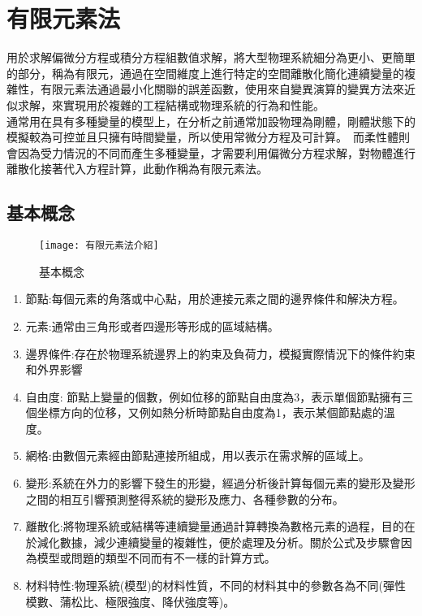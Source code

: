 \chapter{有限元素法}
用於求解偏微分方程或積分方程組數值求解，將大型物理系統細分為更小、更簡單的部分，稱為有限元，通過在空間維度上進行特定的空間離散化簡化連續變量的複雜性，有限元素法通過最小化關聯的誤差函數，使用來自變異演算的變異方法來近似求解，來實現用於複雜的工程結構或物理系統的行為和性能。\\
通常用在具有多種變量的模型上，在分析之前通常加設物理為剛體，剛體狀態下的模擬較為可控並且只擁有時間變量，所以使用常微分方程及可計算。\
而柔性體則會因為受力情況的不同而產生多種變量，才需要利用偏微分方程求解，對物體進行離散化接著代入方程計算，此動作稱為有限元素法。\\
\section{基本概念}

\begin{figure}[hbt!]
\begin{center}
\texttt{[image: 有限元素法介紹]}
\caption{\Large 基本概念}\label{有限元素法介紹}
\end{center}
\end{figure}

\begin{enumerate}
\item 節點:每個元素的角落或中心點，用於連接元素之間的邊界條件和解決方程。
\item 元素:通常由三角形或者四邊形等形成的區域結構。
\item 邊界條件:存在於物理系統邊界上的約束及負荷力，模擬實際情況下的條件約束和外界影響
\item 自由度: 節點上變量的個數，例如位移的節點自由度為3，表示單個節點擁有三個坐標方向的位移，又例如熱分析時節點自由度為1，表示某個節點處的溫度。
\item 網格:由數個元素經由節點連接所組成，用以表示在需求解的區域上。
\item 變形:系統在外力的影響下發生的形變，經過分析後計算每個元素的變形及變形之間的相互引響預測整得系統的變形及應力、各種參數的分布。
\item 離散化:將物理系統或結構等連續變量通過計算轉換為數格元素的過程，目的在於減化數據，減少連續變量的複雜性，便於處理及分析。關於公式及步驟會因為模型或問題的類型不同而有不一樣的計算方式。
\item 材料特性:物理系統(模型)的材料性質，不同的材料其中的參數各為不同(彈性模數、蒲松比、極限強度、降伏強度等)。\
\end{enumerate}

